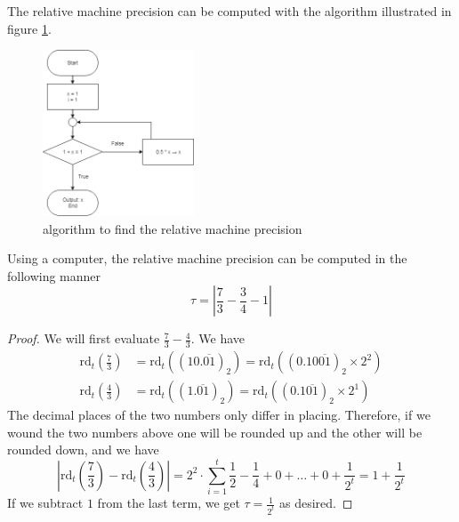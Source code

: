 \begin{theorem}
    The relative machine precision can be computed with the algorithm illustrated in figure \ref{fig:epsilon}.
    \begin{figure}[h]
        \centering
            \includegraphics[width=0.4\textwidth]{graphics/machine_epsilon_flowchart}
        \caption{algorithm to find the relative machine precision}\label{fig:epsilon}
      \end{figure}
\end{theorem}

\begin{theorem}
    Using a computer, the relative machine precision can be computed in the following manner
    \begin{equation*}
        \tau = \left|\frac{7}{3} - \frac{3}{4} - 1\right|
    \end{equation*}
\begin{proof}
    We will first evaluate \(\frac{7}{3} - \frac{4}{3}\). We have
    \begin{align}
        \text{rd}_t(\frac{7}{3}) &= \text{rd}_t((10.\overline{01})_2) = \text{rd}_t((0.10\overline{01})_2 \times 2^2) \\
        \text{rd}_t(\frac{4}{3}) &= \text{rd}_t((1.\overline{01})_2) = \text{rd}_t((0.1\overline{01})_2 \times 2^1)
    \end{align}
    The decimal places of the two numbers only differ in placing. Therefore, if we wound the two numbers above one will be rounded up and the other will be rounded down, and we have
    \begin{equation*}
        \left|\text{rd}_t(\frac{7}{3}) - \text{rd}_t(\frac{4}{3})\right| = 2^2 \cdot \sum_{i=1}^{t} \frac{1}{2} - \frac{1}{4} + 0 + \dots + 0 + \frac{1}{2^t} = 1 + \frac{1}{2^t}
    \end{equation*}
    If we subtract \(1\) from the last term, we get \(\tau = \frac{1}{2^t}\) as desired.
\end{proof}
\end{theorem}